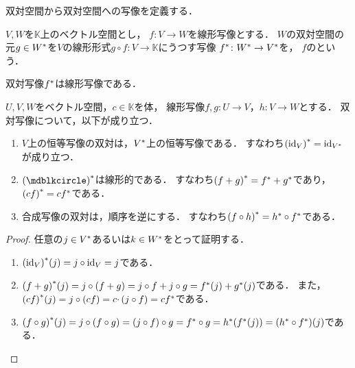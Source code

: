\documentclass[../sotsu.tex]{subfiles}
\begin{document}
双対空間から双対空間への写像を定義する．

\begin{definition}
    \label{dfn:dual-map}
    $V, W$を$𝕂$上のベクトル空間とし，
    $f \colon V \to W$を線形写像とする．
    $W$の双対空間の元$g \in {W}^*$を$V$の線形形式$g \circ f \colon V \to 𝕂$にうつす写像
    ${f}^* \colon {W}^* \to {V}^*$を，
    $f$のという\cite[\S 4.3]{saito-lin-2007}．
\end{definition}

双対写像${f}^*$は線形写像である\cite[\S 4.3]{saito-lin-2007}．

\begin{proposition}
    \label{thm:dual-map-property}
    $U, V, W$をベクトル空間，$c \in 𝕂$を体，
    線形写像$f, g \colon U \to V$，$h \colon V \to W$とする．
    双対写像について，以下が成り立つ\cite[\S 4.3]{saito-lin-2007}．
    \begin{enumerate}
        \item $V$上の恒等写像の双対は，${V}^*$上の恒等写像である．
            すなわち${(\mathrm{id}_V)}^* = \mathrm{id}_{{V}^*}$が成り立つ．
        \item $\dual{(\bigdot)}$は線形的である．
            すなわち${(f + g)}^* = {f}^* + {g}^*$であり，${(cf)}^* = c{f}^*$である．
        \item 合成写像の双対は，順序を逆にする．
            すなわち${(f \circ h)}^* = {h}^* \circ {f}^*$である．
    \end{enumerate}
\end{proposition}

\begin{proof}
    任意の$j \in {V}^*$あるいは$k \in {W}^*$をとって証明する．
    \begin{enumerate}
        \item ${(\mathrm{id}_V)}^*(j) = j \circ \mathrm{id}_V = j$である．
        \item ${(f + g)}^*(j) = j \circ (f + g) = j \circ f + j \circ g = {f}^*(j) + {g}^*(j)$である．
            また，${(cf)}^*(j) = j \circ (cf) = c \cdotp (j \circ f) = c{f}^*$である．
        \item \(
            {(f \circ g)}^*(j) = j \circ (f \circ g) = (j \circ f) \circ g = {f}^* \circ g 
                = {h}^*( {f}^*(j) ) = ({h}^* \circ {f}^*)(j)
            \)である．
    \end{enumerate}
\end{proof}
\end{document}
